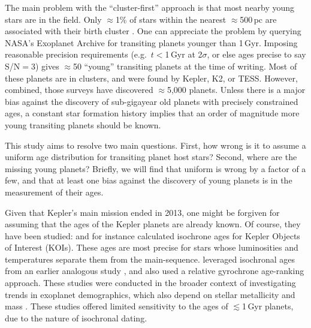 \documentclass[11pt,twocolumn,tighten]{aastex63}
\begin{document}
The main problem with the ``cluster-first'' approach is that most
nearby young stars are in the field.  Only $\approx$1\% of stars
within the nearest $\approx$500\,pc are associated with their birth
cluster
\citep[e.g.][]{Zari_2018,CantatGaudin_2020,Kounkel_2020,Kerr_2021}.
One can appreciate the problem by querying NASA's Exoplanet Archive
\citep[NEA;][]{2013PASP..125..989A} for transiting planets younger
than 1\,Gyr.  Imposing reasonable precision requirements
(e.g.~$t$$<$1\,Gyr at 2$\sigma$, or else ages precise to say S/N$=$3)
gives $\approx$50 ``young'' transiting planets at the time of writing.
Most of these planets are in clusters, and were found by Kepler, K2,
or TESS.  However, combined, those surveys have discovered
$\approx$5{,}000 planets.  Unless there is a major bias against the
discovery of sub-gigayear old planets with precisely constrained ages,
a constant star formation history implies that an order of magnitude
more young transiting planets should be known.

This study aims to resolve two main questions.  First, how wrong is it
to assume a uniform age distribution for transiting planet host stars?
Second, where are the missing young planets?  Briefly, we will find
that uniform is wrong by a factor of a few, and that at least one bias
against the discovery of young planets is in the measurement of their
ages.


Given that Kepler's main mission ended in 2013, one might be forgiven
for assuming that the ages of the Kepler planets are already known.
Of course, they have been studied: \citet{Berger_2020b_rpage} and
\citet{Petigura_2022} for instance calculated isochrone ages for
Kepler Objects of Interest (KOIs).  These ages are most precise for
stars whose luminosities and temperatures separate them from the
main-sequence.  \citet{David_2021} leveraged isochronal ages from an
earlier analogous study \citep{Fulton_2018}, and also used a relative
gyrochrone age-ranking approach.  These studies were conducted in the
broader context of investigating trends in exoplanet demographics,
which also depend on stellar metallicity and mass
\citep[e.g.][]{Petigura_2018}.  These studies offered limited
sensitivity to the ages of $\lesssim$1\,Gyr planets, due to the nature
of isochronal dating.
\end{document}
